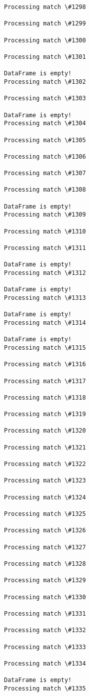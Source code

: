 \documentclass[11pt]{article}
\begin{document}
\begin{Verbatim}[commandchars=\\\{\}]
Processing match \#1298

Processing match \#1299

Processing match \#1300

Processing match \#1301

DataFrame is empty!
Processing match \#1302

Processing match \#1303

DataFrame is empty!
Processing match \#1304

Processing match \#1305

Processing match \#1306

Processing match \#1307

Processing match \#1308

DataFrame is empty!
Processing match \#1309

Processing match \#1310

Processing match \#1311

DataFrame is empty!
Processing match \#1312

DataFrame is empty!
Processing match \#1313

DataFrame is empty!
Processing match \#1314

DataFrame is empty!
Processing match \#1315

Processing match \#1316

Processing match \#1317

Processing match \#1318

Processing match \#1319

Processing match \#1320

Processing match \#1321

Processing match \#1322

Processing match \#1323

Processing match \#1324

Processing match \#1325

Processing match \#1326

Processing match \#1327

Processing match \#1328

Processing match \#1329

Processing match \#1330

Processing match \#1331

Processing match \#1332

Processing match \#1333

Processing match \#1334

DataFrame is empty!
Processing match \#1335


\end{Verbatim}
\end{document}
